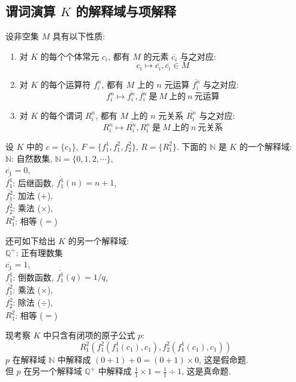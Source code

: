 \documentclass[
    color=black,
    device=normal,
    lang=cn
]{elegantnote}
\begin{document}
\subsection{谓词演算 \texorpdfstring{$K$}{K} 的解释域与项解释}
\begin{definition}[$K$ 的解释域]
    设非空集 $M$ 具有以下性质:
    \begin{enumerate}[label = $\arabic*^\circ$]
        \item 对 $K$ 的每个个体常元 $c_i$, 都有 $M$ 的元素 $\overline{c_i}$ 与之对应: $$c_i\mapsto \overline{c_i}, \overline{c_i}\in M$$
        \item 对 $K$ 的每个运算符 $f_i^n$, 都有 $M$ 上的 $n$ 元运算 $\overline{f_i^n}$ 与之对应: $$f_i^n\mapsto \overline{f_i^n}, \overline{f_i^n}\ \text{是}\ M\ \text{上的}\ n\ \text{元运算}$$
        \item 对 $K$ 的每个谓词 $R_i^n$, 都有 $M$ 上的 $n$ 元关系 $\overline{R_i^n}$ 与之对应: $$R_i^n\mapsto \overline{R_i^n}, \overline{R_i^n}\ \text{是}\ M\ \text{上的}\ n\ \text{元关系}$$
    \end{enumerate}
\end{definition}
\begin{example}
    设 $K$ 中的 $c = \{c_1\}$, $F=\{f_1^1, f_1^2, f_2^2\}$, $R=\{R_1^2\}$. 下面的 $\mathbb{N}$ 是 $K$ 的一个解释域:\\
    $\mathbb{N}$: 自然数集, $\mathbb{N}=\{0, 1, 2, \cdots\}$,\\
    $\overline{c_1}=0$,\\
    $\overline{f_1^1}$: 后继函数, $\overline{f_1^1}(n)=n+1$,\\
    $\overline{f_1^2}$: 加法 ($+$),\\
    $\overline{f_2^2}$: 乘法 ($\times$),\\
    $\overline{R_1^2}$: 相等 ($=$)

    还可如下给出 $K$ 的另一个解释域:\\
    $\mathbb{Q}^+$: 正有理数集\\
    $\overline{c_1}=1$,\\
    $\overline{f_1^1}$: 倒数函数, $\overline{f_1^1}(q)=1/q$,\\
    $\overline{f_1^2}$: 乘法 ($\times$),\\
    $\overline{f_2^2}$: 除法 ($\div$),\\
    $\overline{R_1^2}$: 相等 ($=$)

    现考察 $K$ 中只含有闭项的原子公式 $p$:
    $$
        R_1^2(f_1^2(f_1^1(c_1), c_1), f_2^2(f_1^1(c_1), c_1))
    $$
    $p$ 在解释域 $\mathbb{N}$ 中解释成 $(0+1)+0=(0+1)\times 0$, 这是假命题.\\
    但 $p$ 在另一个解释域 $\mathbb{Q}^+$ 中解释成 $\displaystyle \frac{1}{1}\times 1 = \frac{1}{1}\div 1$, 这是真命题.
\end{example}
\end{document}
